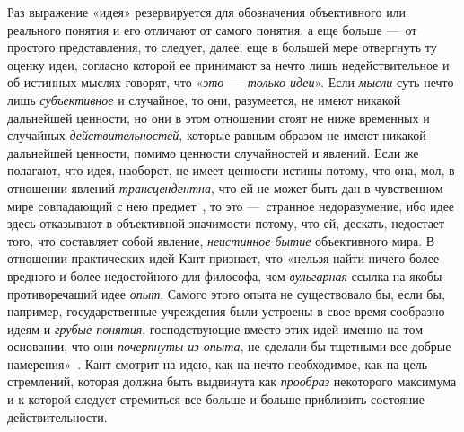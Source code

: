 \documentclass[twoside]{article}
\begin{document}
{{{{Раз выражение «идея» резервируется для обозначения
объективного или реального понятия и его отличают от самого понятия, а еще
больше —~от простого представления, то следует, далее, еще в
большей мере отвергнуть ту оценку идеи, согласно которой ее принимают за
нечто лишь недействительное и об истинных мыслях говорят, что
«{\em это —~только
идеи}». Если {\em мысли}
суть нечто лишь
{\em субъективное} и
случайное, то они, разумеется, не имеют никакой дальнейшей ценности, но они
в этом отношении стоят не ниже временных и случайных
{\em действительностей},
которые равным образом не имеют никакой дальнейшей ценности,
помимо ценности случайностей и явлений. Если же полагают, что идея,
наоборот, не имеет ценности истины потому, что она, мол, в отношении
явлений {\em трансцендентна},
что ей не может быть дан в чувственном мире совпадающий с нею
предмет~\label{bkm:bm87},
то это —~странное недоразумение, ибо идее
здесь отказывают в объективной значимости потому, что ей, дескать,
недостает того, что составляет собой явление,
{\em неистинное бытие}
объективного мира. В отношении практических идей Кант
признает, что «нельзя найти ничего более вредного и более недостойного для
философа, чем {\em вульгарная}
ссылка на якобы противоречащий идее
{\em опыт}. Самого этого
опыта не существовало бы, если бы, например, государственные учреждения
были устроены в свое время сообразно идеям и
{\em грубые понятия},
господствующие вместо этих идей именно на том основании, что
они {\em почерпнуты из опыта},
не сделали бы тщетными все добрые
намерения»~\label{bkm:bm88}.
Кант смотрит на идею, как на нечто необходимое, как на цель
стремлений, которая должна быть выдвинута как
{\em прообраз} некоторого
максимума и к которой следует стремиться все больше и больше приблизить
состояние действительности.

}}}}
\end{document}
